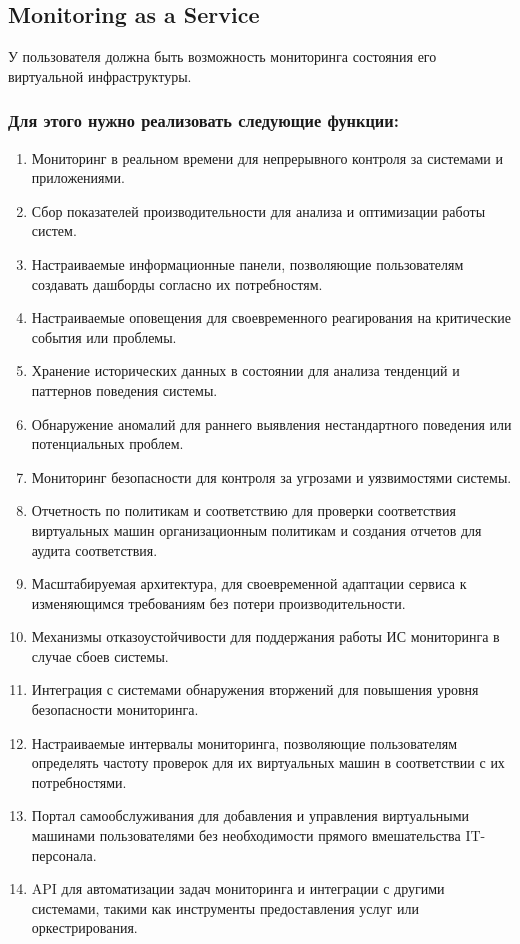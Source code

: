 \documentclass[14pt, a4paper]{extarticle}
\begin{document}
\subsection{Monitoring as a Service}

У пользователя должна быть возможность мониторинга состояния его виртуальной инфраструктуры.

\subsubsection*{Для этого нужно реализовать следующие функции:}

\begin{enumerate}
\item Мониторинг в реальном времени для непрерывного контроля за системами и приложениями.
\item Сбор показателей производительности для анализа и оптимизации работы систем.
\item Настраиваемые информационные панели, позволяющие пользователям создавать дашборды согласно их потребностям.
\item Настраиваемые оповещения для своевременного реагирования на критические события или проблемы.
\item Хранение исторических данных в состоянии для анализа тенденций и паттернов поведения системы.
\item Обнаружение аномалий для раннего выявления нестандартного поведения или потенциальных проблем.
\item Мониторинг безопасности для контроля за угрозами и уязвимостями системы.
\item Отчетность по политикам и соответствию для проверки соответствия виртуальных машин организационным политикам и создания отчетов для аудита соответствия.
\item Масштабируемая архитектура, для своевременной адаптации сервиса к изменяющимся требованиям без потери производительности.
\item Механизмы отказоустойчивости для поддержания работы ИС мониторинга в случае сбоев системы.
\item Интеграция с системами обнаружения вторжений для повышения уровня безопасности мониторинга.
\item Настраиваемые интервалы мониторинга, позволяющие пользователям определять частоту проверок для их виртуальных машин в соответствии с их потребностями.
\item Портал самообслуживания для добавления и управления виртуальными машинами пользователями без необходимости прямого вмешательства IT-персонала.
\item API для автоматизации задач мониторинга и интеграции с другими системами, такими как инструменты предоставления услуг или оркестрирования.
\end{enumerate}
\end{document}
